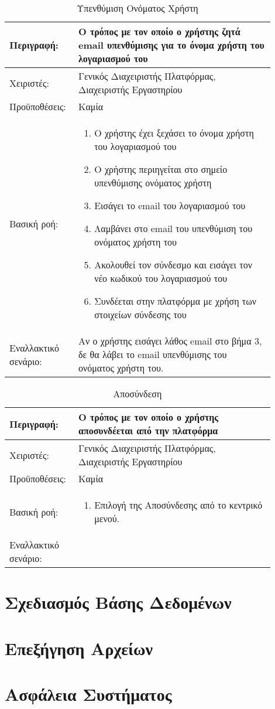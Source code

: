 \begin{table}[h]
	\caption{Υπενθύμιση Ονόματος Χρήστη}
	\label{tab:use-case-forgot-username}
	\begin{tabular}{|p{0.2\linewidth}|p{0.7\linewidth}|}
		\hline
		Περιγραφή: & Ο τρόπος με τον οποίο ο χρήστης ζητά email υπενθύμισης για το όνομα χρήστη του λογαριασμού του \\ \hline
		Χειριστές: & Γενικός Διαχειριστής Πλατφόρμας, Διαχειριστής Εργαστηρίου \\ \hline
		Προϋποθέσεις: & Καμία \\ \hline
		Βασική ροή: & 
		\begin{enumerate}
			\item Ο χρήστης έχει ξεχάσει το όνομα χρήστη του λογαριασμού του
			\item Ο χρήστης περιηγείται στο σημείο υπενθύμισης ονόματος χρήστη
			\item Εισάγει το email του λογαριασμού του
			\item Λαμβάνει στο email του υπενθύμιση του ονόματος χρήστη του
			\item Ακολουθεί τον σύνδεσμο και εισάγει τον νέο κωδικού του λογαριασμού του
			\item Συνδέεται στην πλατφόρμα με χρήση των στοιχείων σύνδεσης του
		\end{enumerate} \\ \hline
		Εναλλακτικό σενάριο: & Αν ο χρήστης εισάγει λάθος email στο βήμα 3, δε θα λάβει το email υπενθύμισης του ονόματος χρήστη του. \\ \hline
	\end{tabular}
\end{table}

\begin{table}[h]
	\caption{Αποσύνδεση}
	\label{tab:use-case-logout}
	\begin{tabular}{|p{0.2\linewidth}|p{0.7\linewidth}|}
		\hline
		Περιγραφή: & Ο τρόπος με τον οποίο ο χρήστης αποσυνδέεται από την πλατφόρμα \\ \hline
		Χειριστές: & Γενικός Διαχειριστής Πλατφόρμας, Διαχειριστής Εργαστηρίου \\ \hline
		Προϋποθέσεις: & Καμία \\ \hline
		Βασική ροή: & 
		\begin{enumerate}
			\item Επιλογή της Αποσύνδεσης από το κεντρικό μενού.
		\end{enumerate} \\ \hline
		Εναλλακτικό σενάριο: & \\ \hline
	\end{tabular}
\end{table}

\section{Σχεδιασμός Βάσης Δεδομένων}



\section{Επεξήγηση Αρχείων}

\section{Ασφάλεια Συστήματος}
